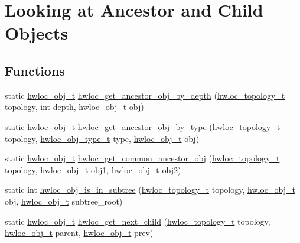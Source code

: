 \hypertarget{a00197}{}\section{Looking at Ancestor and Child Objects}
\label{a00197}
\subsection*{Functions}
\begin{DoxyCompactItemize}
\item 
static \hyperlink{a00185_ga79b8ab56877ef99ac59b833203391c7d}{hwloc\+\_\+obj\+\_\+t} \hyperlink{a00197_ga9f8c93fde236e9642a96957af01a11cb}{hwloc\+\_\+get\+\_\+ancestor\+\_\+obj\+\_\+by\+\_\+depth} (\hyperlink{a00186_ga9d1e76ee15a7dee158b786c30b6a6e38}{hwloc\+\_\+topology\+\_\+t} topology, int depth, \hyperlink{a00185_ga79b8ab56877ef99ac59b833203391c7d}{hwloc\+\_\+obj\+\_\+t} obj)
\item 
static \hyperlink{a00185_ga79b8ab56877ef99ac59b833203391c7d}{hwloc\+\_\+obj\+\_\+t} \hyperlink{a00197_ga70f0c7583291da707c15ae4daa850f41}{hwloc\+\_\+get\+\_\+ancestor\+\_\+obj\+\_\+by\+\_\+type} (\hyperlink{a00186_ga9d1e76ee15a7dee158b786c30b6a6e38}{hwloc\+\_\+topology\+\_\+t} topology, \hyperlink{a00184_gacd37bb612667dc437d66bfb175a8dc55}{hwloc\+\_\+obj\+\_\+type\+\_\+t} type, \hyperlink{a00185_ga79b8ab56877ef99ac59b833203391c7d}{hwloc\+\_\+obj\+\_\+t} obj)
\item 
static \hyperlink{a00185_ga79b8ab56877ef99ac59b833203391c7d}{hwloc\+\_\+obj\+\_\+t} \hyperlink{a00197_gab1fa883021928b5c476911c4102e9be3}{hwloc\+\_\+get\+\_\+common\+\_\+ancestor\+\_\+obj} (\hyperlink{a00186_ga9d1e76ee15a7dee158b786c30b6a6e38}{hwloc\+\_\+topology\+\_\+t} topology, \hyperlink{a00185_ga79b8ab56877ef99ac59b833203391c7d}{hwloc\+\_\+obj\+\_\+t} obj1, \hyperlink{a00185_ga79b8ab56877ef99ac59b833203391c7d}{hwloc\+\_\+obj\+\_\+t} obj2)
\item 
static int \hyperlink{a00197_ga408cf74f5bf9ed497911a320c7f8cc56}{hwloc\+\_\+obj\+\_\+is\+\_\+in\+\_\+subtree} (\hyperlink{a00186_ga9d1e76ee15a7dee158b786c30b6a6e38}{hwloc\+\_\+topology\+\_\+t} topology, \hyperlink{a00185_ga79b8ab56877ef99ac59b833203391c7d}{hwloc\+\_\+obj\+\_\+t} obj, \hyperlink{a00185_ga79b8ab56877ef99ac59b833203391c7d}{hwloc\+\_\+obj\+\_\+t} subtree\+\_\+root)
\item 
static \hyperlink{a00185_ga79b8ab56877ef99ac59b833203391c7d}{hwloc\+\_\+obj\+\_\+t} \hyperlink{a00197_ga12d8565a3436c565e791ed02a0353621}{hwloc\+\_\+get\+\_\+next\+\_\+child} (\hyperlink{a00186_ga9d1e76ee15a7dee158b786c30b6a6e38}{hwloc\+\_\+topology\+\_\+t} topology, \hyperlink{a00185_ga79b8ab56877ef99ac59b833203391c7d}{hwloc\+\_\+obj\+\_\+t} parent, \hyperlink{a00185_ga79b8ab56877ef99ac59b833203391c7d}{hwloc\+\_\+obj\+\_\+t} prev)
\end{DoxyCompactItemize}


